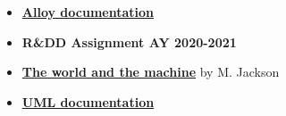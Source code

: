 \documentclass[../../main.tex]{subfiles}
\begin{document}
\begin{itemize}
    \item \textbf{\href{https://alloytools.org/documentation.html}{Alloy documentation}}
    \item \textbf{R\&DD Assignment AY 2020-2021}
    \item \textbf{\href{http://mcs.open.ac.uk/mj665/icse17kn.pdf}{The world and the machine}} by M. Jackson
    \item \textbf{\href{https://www.uml-diagrams.org/}{UML documentation}}
\end{itemize}
\end{document}
